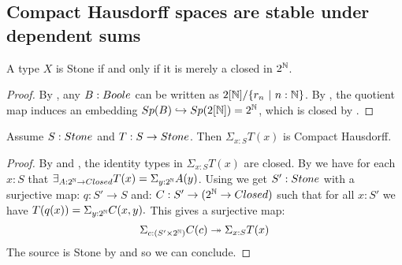\subsection{Compact Hausdorff spaces are stable under dependent sums}

\begin{lemma}\label{StoneAsClosedSubsetOfCantor}
A type $X$ is Stone if and only if it is merely a closed in $2^{\mathbb{N}}$.
\end{lemma}
\begin{proof}
  By , any $B:\Boole$ can be written as $2[\N]/\{r_n\ |\ n:\N\}$.
  By , the quotient map induces an embedding $Sp(B)\hookrightarrow Sp(2[\mathbb{N}])= 2^{\mathbb{N}}$, 
  which is closed by .
\end{proof}

%
\begin{lemma}\label{SigmaStoneCompactHausdorff}
Assume $S:\Stone$ and $T:S\to \Stone$. Then $\Sigma_{x:S}T(x)$ is Compact Hausdorff.
\end{lemma}

\begin{proof}
  By  and , the identity types in $\Sigma_{x:S}T(x)$ are closed.
  By  %
%
  we have for each $x:S$ that 
  $\exists_{A:2^\N\to \Closed} T(x) = \Sigma_{y:2^\N}A(y)$. 
  Using  we get $S':\Stone$ with a surjective map:
  $q:S'\to S$ 
and:
$ C : S'\to (2^\N\to\Closed)$
  such that for all $x:S'$ we have 
  $T(q(x)) = \Sigma_{y:2^{\mathbb{N}}}C(x,y).$
This gives a surjective map:
$$ \Sigma_{c:(S'\times 2^{\mathbb{N}})}C(c)\twoheadrightarrow \Sigma_{x:S}T(x)$$
The source is Stone by  and  so we can conclude.
\end{proof}

